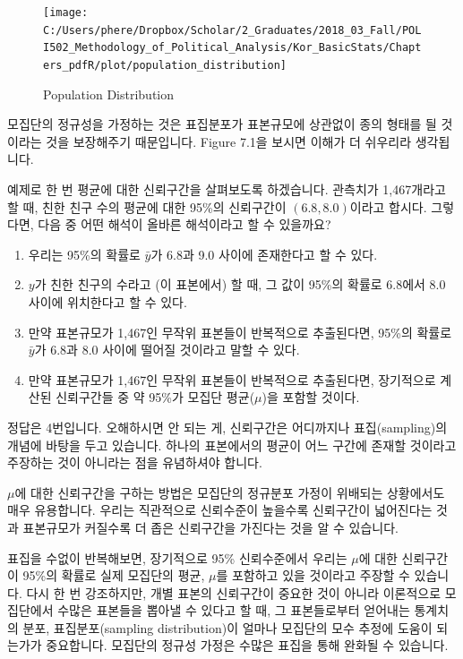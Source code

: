 \documentclass[]{book}
\begin{document}
\begin{figure}[b]

{\centering \texttt{[image: C:/Users/phere/Dropbox/Scholar/2\_Graduates/2018\_03\_Fall/POLI502\_Methodology\_of\_Political\_Analysis/Kor\_BasicStats/Chapters\_pdfR/plot/population\_distribution]} 

}

\caption{Population Distribution}\label{fig:unnamed-chunk-209}
\end{figure}

모집단의 정규성을 가정하는 것은 표집분포가 표본규모에 상관없이 종의 형태를 딀 것이라는 것을 보장해주기 때문입니다. Figure 7.1을 보시면 이해가 더 쉬우리라 생각됩니다.

예제로 한 번 평균에 대한 신뢰구간을 살펴보도록 하겠습니다. 관측치가 1,467개라고 할 때, 친한 친구 수의 평균에 대한 95\%의 신뢰구간이 \((6.8, 8.0)\)이라고 합시다. 그렇다면, 다음 중 어떤 해석이 올바른 해석이라고 할 수 있을까요?

\begin{enumerate}
\def\labelenumi{\arabic{enumi}.}
\item
  우리는 95\%의 확률로 \(\bar{y}\)가 6.8과 9.0 사이에 존재한다고 할 수 있다.
\item
  \(y\)가 친한 친구의 수라고 (이 표본에서) 할 때, 그 값이 95\%의 확률로 6.8에서 8.0 사이에 위치한다고 할 수 있다.
\item
  만약 표본규모가 1,467인 무작위 표본들이 반복적으로 추출된다면, 95\%의 확률로 \(\bar{y}\)가 6.8과 8.0 사이에 떨어질 것이라고 말할 수 있다.
\item
  만약 표본규모가 1,467인 무작위 표본들이 반복적으로 추출된다면, 장기적으로 계산된 신뢰구간들 중 약 95\%가 모집단 평균(\(\mu\))을 포함할 것이다.
\end{enumerate}

정답은 4번입니다. 오해하시면 안 되는 게, 신뢰구간은 어디까지나 표집(sampling)의 개념에 바탕을 두고 있습니다. 하나의 표본에서의 평균이 어느 구간에 존재할 것이라고 주장하는 것이 아니라는 점을 유념하셔야 합니다.

\(\mu\)에 대한 신뢰구간을 구하는 방법은 모집단의 정규분포 가정이 위배되는 상황에서도 매우 유용합니다. 우리는 직관적으로 신뢰수준이 높을수록 신뢰구간이 넓어진다는 것과 표본규모가 커질수록 더 좁은 신뢰구간을 가진다는 것을 알 수 있습니다.

표집을 수없이 반복해보면, 장기적으로 95\% 신뢰수준에서 우리는 \(\mu\)에 대한 신뢰구간이 95\%의 확률로 실제 모집단의 평균, \(\mu\)를 포함하고 있을 것이라고 주장할 수 있습니다. 다시 한 번 강조하지만, 개별 표본의 신뢰구간이 중요한 것이 아니라 이론적으로 모집단에서 수많은 표본들을 뽑아낼 수 있다고 할 때, 그 표본들로부터 얻어내는 통계치의 분포, 표집분포(sampling distribution)이 얼마나 모집단의 모수 추정에 도움이 되는가가 중요합니다. 모집단의 정규성 가정은 수많은 표집을 통해 완화될 수 있습니다.
\end{document}
